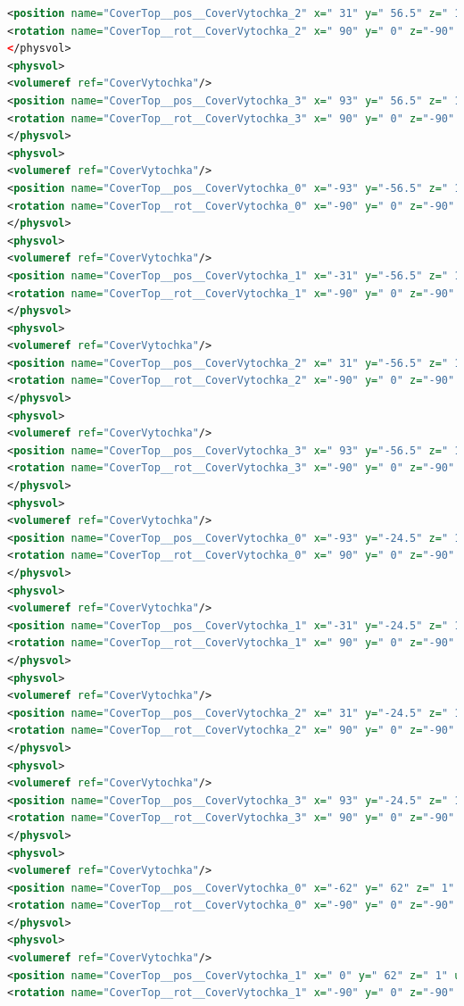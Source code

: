 \begin{lstlisting}[language=XML, firstline=1, lastline=89]
<position name="CoverTop__pos__CoverVytochka_2" x=" 31" y=" 56.5" z=" 1" unit="mm"/>
<rotation name="CoverTop__rot__CoverVytochka_2" x=" 90" y=" 0" z="-90" unit="deg"/>
</physvol>
<physvol>
<volumeref ref="CoverVytochka"/>
<position name="CoverTop__pos__CoverVytochka_3" x=" 93" y=" 56.5" z=" 1" unit="mm"/>
<rotation name="CoverTop__rot__CoverVytochka_3" x=" 90" y=" 0" z="-90" unit="deg"/>
</physvol>
<physvol>
<volumeref ref="CoverVytochka"/>
<position name="CoverTop__pos__CoverVytochka_0" x="-93" y="-56.5" z=" 1" unit="mm"/>
<rotation name="CoverTop__rot__CoverVytochka_0" x="-90" y=" 0" z="-90" unit="deg"/>
</physvol>
<physvol>
<volumeref ref="CoverVytochka"/>
<position name="CoverTop__pos__CoverVytochka_1" x="-31" y="-56.5" z=" 1" unit="mm"/>
<rotation name="CoverTop__rot__CoverVytochka_1" x="-90" y=" 0" z="-90" unit="deg"/>
</physvol>
<physvol>
<volumeref ref="CoverVytochka"/>
<position name="CoverTop__pos__CoverVytochka_2" x=" 31" y="-56.5" z=" 1" unit="mm"/>
<rotation name="CoverTop__rot__CoverVytochka_2" x="-90" y=" 0" z="-90" unit="deg"/>
</physvol>
<physvol>
<volumeref ref="CoverVytochka"/>
<position name="CoverTop__pos__CoverVytochka_3" x=" 93" y="-56.5" z=" 1" unit="mm"/>
<rotation name="CoverTop__rot__CoverVytochka_3" x="-90" y=" 0" z="-90" unit="deg"/>
</physvol>
<physvol>
<volumeref ref="CoverVytochka"/>
<position name="CoverTop__pos__CoverVytochka_0" x="-93" y="-24.5" z=" 1" unit="mm"/>
<rotation name="CoverTop__rot__CoverVytochka_0" x=" 90" y=" 0" z="-90" unit="deg"/>
</physvol>
<physvol>
<volumeref ref="CoverVytochka"/>
<position name="CoverTop__pos__CoverVytochka_1" x="-31" y="-24.5" z=" 1" unit="mm"/>
<rotation name="CoverTop__rot__CoverVytochka_1" x=" 90" y=" 0" z="-90" unit="deg"/>
</physvol>
<physvol>
<volumeref ref="CoverVytochka"/>
<position name="CoverTop__pos__CoverVytochka_2" x=" 31" y="-24.5" z=" 1" unit="mm"/>
<rotation name="CoverTop__rot__CoverVytochka_2" x=" 90" y=" 0" z="-90" unit="deg"/>
</physvol>
<physvol>
<volumeref ref="CoverVytochka"/>
<position name="CoverTop__pos__CoverVytochka_3" x=" 93" y="-24.5" z=" 1" unit="mm"/>
<rotation name="CoverTop__rot__CoverVytochka_3" x=" 90" y=" 0" z="-90" unit="deg"/>
</physvol>
<physvol>
<volumeref ref="CoverVytochka"/>
<position name="CoverTop__pos__CoverVytochka_0" x="-62" y=" 62" z=" 1" unit="mm"/>
<rotation name="CoverTop__rot__CoverVytochka_0" x="-90" y=" 0" z="-90" unit="deg"/>
</physvol>
<physvol>
<volumeref ref="CoverVytochka"/>
<position name="CoverTop__pos__CoverVytochka_1" x=" 0" y=" 62" z=" 1" unit="mm"/>
<rotation name="CoverTop__rot__CoverVytochka_1" x="-90" y=" 0" z="-90" unit="deg"/>

\end{lstlisting}
